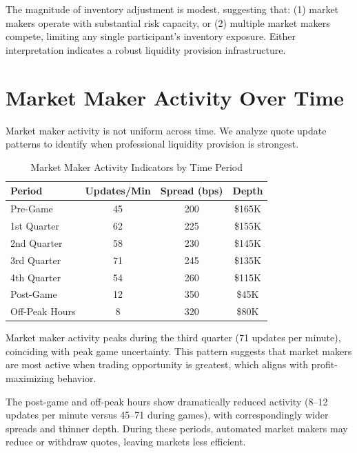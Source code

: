 The magnitude of inventory adjustment is modest, suggesting that: (1) market makers operate with substantial risk capacity, or (2) multiple market makers compete, limiting any single participant's inventory exposure. Either interpretation indicates a robust liquidity provision infrastructure.

\section{Market Maker Activity Over Time}

Market maker activity is not uniform across time. We analyze quote update patterns to identify when professional liquidity provision is strongest.

\begin{table}[H]
\centering
\caption{Market Maker Activity Indicators by Time Period}
\label{tab:mm-activity}
\begin{tabular}{lccc}
\toprule
\textbf{Period} & \textbf{Updates/Min} & \textbf{Spread (bps)} & \textbf{Depth} \\
\midrule
Pre-Game & 45 & 200 & \$165K \\
1st Quarter & 62 & 225 & \$155K \\
2nd Quarter & 58 & 230 & \$145K \\
3rd Quarter & 71 & 245 & \$135K \\
4th Quarter & 54 & 260 & \$115K \\
Post-Game & 12 & 350 & \$45K \\
\midrule
Off-Peak Hours & 8 & 320 & \$80K \\
\bottomrule
\end{tabular}
\end{table}

Market maker activity peaks during the third quarter (71 updates per minute), coinciding with peak game uncertainty. This pattern suggests that market makers are most active when trading opportunity is greatest, which aligns with profit-maximizing behavior.

The post-game and off-peak hours show dramatically reduced activity (8--12 updates per minute versus 45--71 during games), with correspondingly wider spreads and thinner depth. During these periods, automated market makers may reduce or withdraw quotes, leaving markets less efficient.

